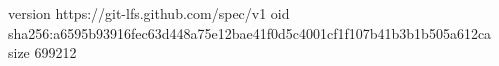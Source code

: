 version https://git-lfs.github.com/spec/v1
oid sha256:a6595b93916fec63d448a75e12bae41f0d5c4001cf1f107b41b3b1b505a612ca
size 699212
